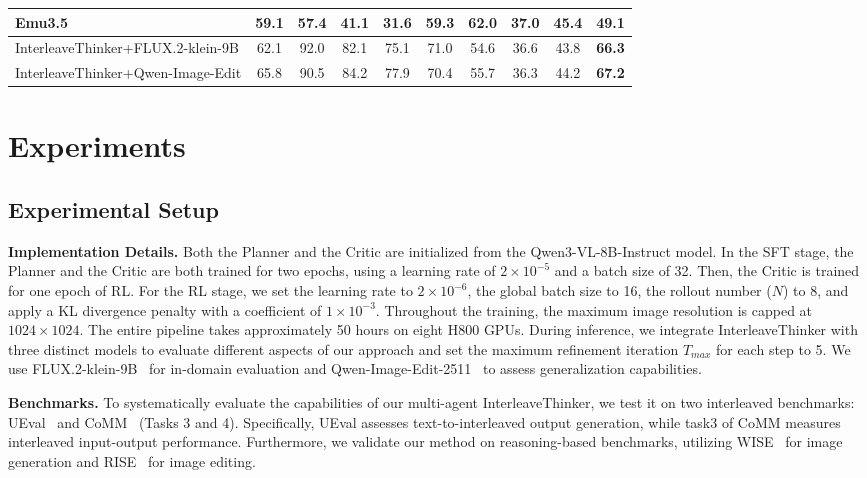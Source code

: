 \documentclass{article} %
\begin{document}
\begin{table}[t]
{\begin{tabular}{l ccccccccc}
    Emu3.5~\cite{cui2025emu3_5} & 59.1 & 57.4 & 41.1 & 31.6 & 59.3 & 62.0 & 37.0 & 45.4 & 49.1 \\
    \midrule[0.1em]
    InterleaveThinker+FLUX.2-klein-9B & 62.1 & 92.0 & 82.1 & 75.1 & 71.0 & 54.6 & 36.6 & 43.8 & \textbf{66.3} \\
    InterleaveThinker+Qwen-Image-Edit & 65.8 & 90.5 & 84.2 & 77.9 & 70.4 & 55.7 & 36.3 & 44.2 & \textbf{67.2} \\
    \bottomrule[0.1em]
  \end{tabular}
  }
  \vspace{-1em}
\end{table}

\section{Experiments}
\label{sec:exp}
\subsection{Experimental Setup}
\label{subsec:imp_detail}
\textbf{Implementation Details.} Both the Planner and the Critic are initialized from the Qwen3-VL-8B-Instruct model. In the SFT stage, the Planner and the Critic are both trained for two epochs, using a learning rate of $2 \times 10^{-5}$ and a batch size of 32. Then, the Critic is trained for one epoch of RL. For the RL stage, we set the learning rate to $2 \times 10^{-6}$, the global batch size to 16, the rollout number ($N$) to 8, and apply a KL divergence penalty with a coefficient of $1 \times 10^{-3}$. Throughout the training, the maximum image resolution is capped at $1024 \times 1024$. The entire pipeline takes approximately 50 hours on eight H800 GPUs. During inference, we integrate InterleaveThinker with three distinct models to evaluate different aspects of our approach and set the maximum refinement iteration $T_{max}$ for each step to 5. We use FLUX.2-klein-9B~\cite{flux2} for in-domain evaluation and Qwen-Image-Edit-2511~\cite{qwenimage} to assess generalization capabilities. 

\textbf{Benchmarks.} To systematically evaluate the capabilities of our multi-agent InterleaveThinker, we test it on two interleaved benchmarks: UEval~\cite{li2026ueval} and CoMM~\cite{chen2024comm} (Tasks 3 and 4). Specifically, UEval assesses text-to-interleaved output generation, while task3 of CoMM measures interleaved input-output performance. Furthermore, we validate our method on reasoning-based benchmarks, utilizing WISE~\cite{niu2025wise} for image generation and RISE~\cite{rise} for image editing.
\end{document}
